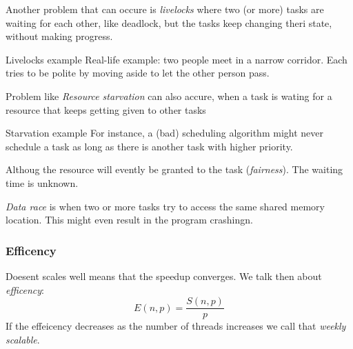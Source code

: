 Another problem that can occure is \textit{livelocks} where two (or more) tasks are waiting for each
other, like deadlock, but the tasks keep changing theri state, without making progress.
\begin{exampleblock}{Livelocks example}
  Real-life example: two people meet in a narrow corridor. Each tries to be
polite by moving aside to let the other person pass.
\end{exampleblock}

Problem like \textit{Resource starvation} can also accure, when a task is wating for a resource that keeps getting given to other tasks
\begin{exampleblock}{Starvation example}
  For instance, a (bad) scheduling algorithm might never schedule a task as
  long as there is another task with higher priority.
\end{exampleblock}

Althoug the resource will evently be granted to the task (\textit{fairness}). The waiting time is unknown.

\textit{Data race} is when two or more tasks try to access the same shared memory location. This
might even result in the program crashingn.


\subsubsection{Efficency}
Doesent scales well means that the speedup converges. We talk then about \textit{efficency}:
\begin{equation}
  E(n,p) = \frac{S(n,p)}{p}
\end{equation}
If the effeicency decreases as the number of threads increases we call that \textit{weekly scalable}.


